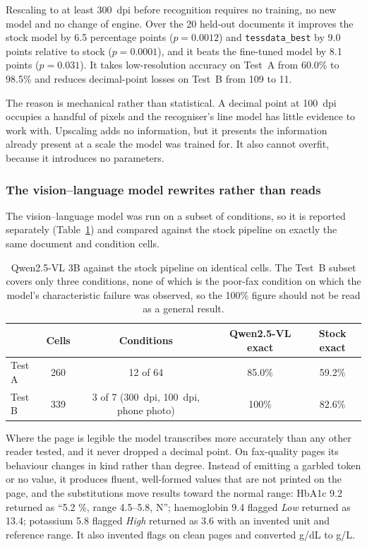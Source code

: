 \documentclass[11pt]{article}
\begin{document}
Rescaling to at least 300~dpi before recognition requires no training, no new model and no
change of engine. Over the 20 held-out documents it improves the stock model by 6.5 percentage
points ($p = 0.0012$) and \texttt{tessdata\_best} by 9.0 points relative to stock
($p = 0.0001$), and it beats the fine-tuned model by 8.1 points ($p = 0.031$). It takes
low-resolution accuracy on Test~A from 60.0\% to 98.5\% and reduces decimal-point losses on
Test~B from 109 to 11.

The reason is mechanical rather than statistical. A decimal point at 100~dpi occupies a handful
of pixels and the recogniser's line model has little evidence to work with. Upscaling adds no
information, but it presents the information already present at a scale the model was trained
for. It also cannot overfit, because it introduces no parameters.

\subsubsection{The vision--language model rewrites rather than reads}

The vision--language model was run on a subset of conditions, so it is reported separately
(Table~\ref{tab:vlm}) and compared against the stock pipeline on exactly the same document and
condition cells.

\begin{table}[t]
\centering
\caption{Qwen2.5-VL 3B against the stock pipeline on identical cells. The Test~B subset covers
only three conditions, none of which is the poor-fax condition on which the model's
characteristic failure was observed, so the 100\% figure should not be read as a general result.}
\label{tab:vlm}
\small
\begin{tabular}{lcccc}
\toprule
 & Cells & Conditions & Qwen2.5-VL exact & Stock exact \\
\midrule
Test A & 260 & 12 of 64 & 85.0\% & 59.2\% \\
Test B & 339 & 3 of 7 (300~dpi, 100~dpi, phone photo) & 100\% & 82.6\% \\
\bottomrule
\end{tabular}
\end{table}

Where the page is legible the model transcribes more accurately than any other reader tested,
and it never dropped a decimal point. On fax-quality pages its behaviour changes in kind rather
than degree. Instead of emitting a garbled token or no value, it produces fluent, well-formed
values that are not printed on the page, and the substitutions move results toward the normal
range: HbA1c 9.2 returned as ``5.2 \%, range 4.5--5.8, N''; haemoglobin 9.4 flagged \emph{Low}
returned as 13.4; potassium 5.8 flagged \emph{High} returned as 3.6 with an invented unit and
reference range. It also invented flags on clean pages and converted g/dL to g/L.
\end{document}
